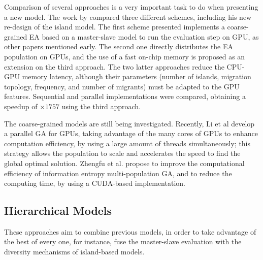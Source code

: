 \documentclass{article}
\begin{document}
Comparison of several approaches is a very important task to do when presenting a new model. The work by \cite{LUONG:2010:INRIA-00520464:1} compared three different schemes, including his new re-design of the island model. The first scheme presented implements a coarse-grained EA based on a master-slave model to run the evaluation step on GPU, as other papers mentioned early. The second one directly distributes the EA population on GPUs, and the use of a fast on-chip memory is proposed as an extension on the third approach. 
The two latter approaches reduce the CPU-GPU memory latency, although their parameters (number of islands, migration topology, frequency, and number of migrants) must be adapted to the GPU features. Sequential and parallel implementations were compared, obtaining a speedup of $\times1757$ using the third approach.



The coarse-grained models are still being investigated. Recently, Li et al \cite{Li2016} develop a parallel GA for GPUs, taking advantage of the many cores of GPUs to enhance computation efficiency, by using a large amount of threads simultaneously; this strategy allows the population to scale and accelerates the speed to find the global optimal solution. Zhengfu et al. \cite{Zhengfu2016} propose to improve the computational efficiency of information entropy multi-population GA, and to reduce the computing time, by using a CUDA-based implementation.


\subsection{Hierarchical Models}

These approaches aim to combine previous models, in order to take advantage of the best of every one, for instance, fuse the master-slave evaluation with the diversity mechanisms of island-based models.
\end{document}
